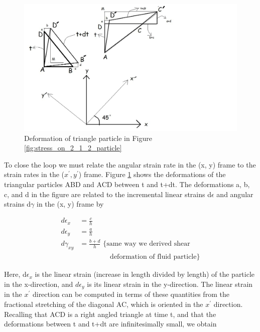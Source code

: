 \documentclass{article}
\begin{document}
{\begin{figure}[h!]
\centering
\includegraphics[scale=.43]{Deformation of triangle particle.jpg}
\caption{Deformation of triangle particle in Figure \ref{fig:stress_on_2_1_2_particle}}
\label{fig:Defrmtn_of_trngl_prtcl}
\end{figure}

To close the loop we must relate the angular strain rate in the (x, y) frame to the
strain rates in the ($x^{'},y^{'}$) frame. Figure \ref{fig:Defrmtn_of_trngl_prtcl} shows the deformations of the triangular particles ABD and ACD between t and t+dt. The deformations a, b, c, and d in the figure are related to the incremental linear strains d$\epsilon$ and angular strains d$\gamma$ in the (x, y) frame by

\begin{equation} \label{e21}
\begin{split}
d\epsilon_{x} &= \frac{c}{h}\\
d\epsilon_{y} &= \frac{a}{h}\\
d\gamma_{xy} &= \frac{b+d}{h} \text{ \{same way we derived shear}\\ 
			 &	\quad\quad\quad\quad \text{ deformation of fluid particle\}}
\end{split}
\end{equation}

Here, d$\epsilon_{x}$ is the linear strain (increase in length divided by length) of the particle in the x-direction, and $d\epsilon_{y}$ is its linear strain in the y-direction. The linear strain in the $x^{'}$ direction can be computed in terms of these quantities from the fractional stretching of the diagonal AC, which is oriented in the $x^{'}$ direction. Recalling that ACD is a right angled triangle at time t, and that the deformations between t and t+dt are infinitesimally small, we obtain

}
\end{document}
